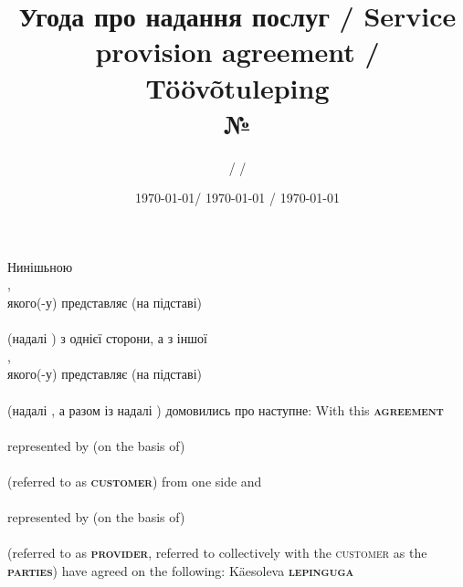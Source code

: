   \begin{Form}
    \title{Угода про надання послуг / Service provision agreement / Töövõtuleping\\№ }
    \author{ /  / }
    \date{\today / \textenglish{\today} / \textestonian{\today}}
    \maketitle
    \thispagestyle{fancy}

    \begin{paracol}{3}
      \freetext %
        {Нинішьною \textbf{}\\
          ,\\
          якого(-у) представляє (на підставі)\\
          \\
          (надалі \textbf{}) з однієї сторони, а з іншої\\
          ,\\
          якого(-у) представляє (на підставі)\\
          \\
          (надалі \textbf{}, а разом із  надалі \textbf{}) домовились про наступне:
        }
        { With this \textbf{\textsc{agreement}}\\
          \\
          represented by (on the basis of)\\
          \\
          (referred to as \textbf{\textsc{customer}}) from one side and\\
          \\
          represented by (on the basis of)\\
          \\
          (referred to as \textbf{\textsc{provider}}, referred to collectively with the \textsc{customer} as the \textbf{\textsc{parties}}) have agreed on the following:
        }
        {
          Käesoleva \textbf{\textsc{lepinguga}}\\
}
\end{paracol}
\end{Form}
